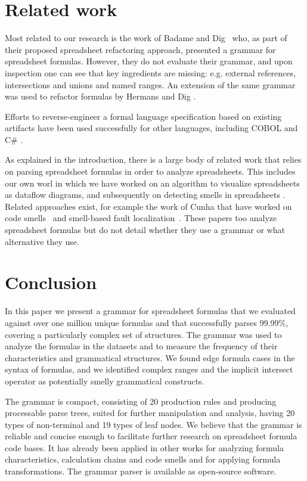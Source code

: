 \documentclass[conference]{IEEEtran}
\begin{document}
\section{Related work}
\label{section:relatedWork}
Most related to our research is the work of Badame and Dig~\cite{badame2012refactoring} who, as part of their proposed spreadsheet refactoring approach, presented a grammar for spreadsheet formulas. However, they do not evaluate their grammar, and upon inspection one can see that key ingredients are missing: e.g. external references, intersections and unions and named ranges. An extension of the same grammar was used to refactor formulas by Hermans and Dig \cite{hermans2014bumblebee}.

Efforts to reverse-engineer a formal language specification based on existing artifacts have been used successfully for other languages, including COBOL \cite{van1997obtaining} and C\# \cite{zaytsev2010recovery}.

As explained in the introduction, there is a large body of related work that relies on parsing spreadsheet formulas in order to analyze spreadsheets. This includes our own worl in which we have worked on an algorithm to visualize spreadsheets as dataflow diagrams\cite{DBLP:conf/icse/HermansPD11}, and subsequently on detecting smells in spreadsheets \cite{DBLP:conf/icse/HermansPD12,DBLP:conf/icsm/Hermans212}. Related approaches exist, for example the work of Cunha that have worked on code smells~\cite{iccsa12} and smell-based fault localization~\cite{conf/icsme/CunhaFMPS14}. These papers too analyze spreadsheet formulas but do not detail whether they use a grammar or what alternative they use.

\section{Conclusion}
\label{section:conclusion}

In this paper we present a grammar for spreadsheet formulas that we evaluated against over one million unique formulas and that successfully parses 99.99\%, covering a particularly complex set of structures. The grammar was used to analyze the formulas in the datasets and to measure the frequency of their characteristics and grammatical structures. We found edge formula cases in the syntax of formulas, and we identified complex ranges and the implicit intersect operator as potentially smelly grammatical constructs.

The grammar is compact, consisting of 20 production rules and producing processable parse trees, suited for further manipulation and analysis, having 20 types of non-terminal and 19 types of leaf nodes. We believe that the grammar is reliable and concise enough to facilitate further research on spreadsheet formula code bases. It has already been applied in other works for analyzing formula characteristics, calculation chains and code smells and for applying formula transformations. The grammar parser is available as open-source software.
\end{document}
